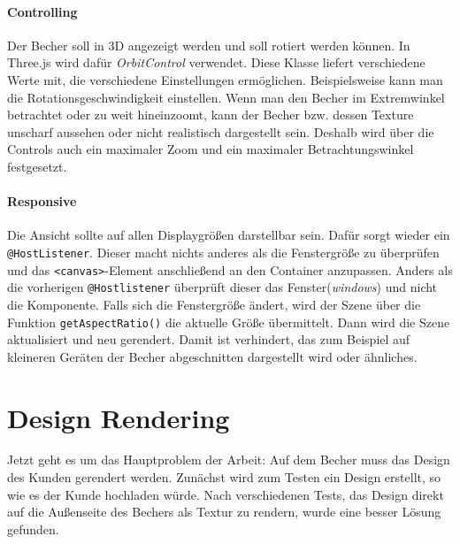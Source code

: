 \paragraph{Controlling}
Der Becher soll in 3D angezeigt werden und soll rotiert werden können. In Three.js wird dafür \textit{OrbitControl} verwendet. Diese Klasse liefert verschiedene Werte mit, die verschiedene Einstellungen ermöglichen. Beispielsweise kann man die Rotationsgeschwindigkeit einstellen. Wenn man den Becher im Extremwinkel betrachtet oder zu weit hineinzoomt, kann der Becher bzw. dessen Texture unscharf aussehen oder nicht realistisch dargestellt sein. Deshalb wird über die Controls auch ein maximaler Zoom und ein maximaler Betrachtungswinkel festgesetzt.
\paragraph{Responsive} Die Ansicht sollte auf allen Displaygrößen darstellbar sein. Dafür sorgt wieder ein \texttt{@HostListener}. Dieser macht nichts anderes als die Fenstergröße zu überprüfen und das \texttt{<canvas>}-Element anschließend an den Container anzupassen. Anders als die vorherigen \texttt{@Hostlistener} überprüft dieser das Fenster(\textit{windows}) und nicht die Komponente. Falls sich die Fenstergröße ändert, wird der Szene über die Funktion \texttt{getAspectRatio()} die aktuelle Größe übermittelt. Dann wird die Szene aktualisiert und neu gerendert. Damit ist verhindert, das zum Beispiel auf kleineren Geräten der Becher abgeschnitten dargestellt wird oder ähnliches.
%
\section{Design Rendering}
\label{sec:umsetzung}
%
Jetzt geht es um das Hauptproblem der Arbeit: Auf dem Becher muss das Design des Kunden gerendert werden. Zunächst wird zum Testen ein Design erstellt, so wie es der Kunde hochladen würde. Nach verschiedenen Tests, das Design direkt auf die Außenseite des Bechers als Textur zu rendern, wurde eine besser Lösung gefunden. 
